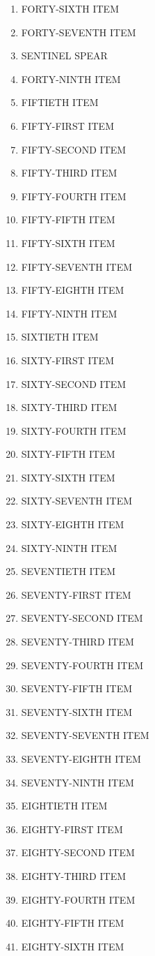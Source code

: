 \documentclass[11pt,letterpaper,oldstylefigures]{memoir}
\begin{document}
\begin{enumerate}
\item FORTY-SIXTH ITEM
\item FORTY-SEVENTH ITEM
\item SENTINEL SPEAR
\item FORTY-NINTH ITEM
\item FIFTIETH ITEM
\item FIFTY-FIRST ITEM
\item FIFTY-SECOND ITEM
\item FIFTY-THIRD ITEM
\item FIFTY-FOURTH ITEM
\item FIFTY-FIFTH ITEM
\item FIFTY-SIXTH ITEM
\item FIFTY-SEVENTH ITEM
\item FIFTY-EIGHTH ITEM
\item FIFTY-NINTH ITEM
\item SIXTIETH ITEM
\item SIXTY-FIRST ITEM
\item SIXTY-SECOND ITEM
\item SIXTY-THIRD ITEM
\item SIXTY-FOURTH ITEM
\item SIXTY-FIFTH ITEM
\item SIXTY-SIXTH ITEM
\item SIXTY-SEVENTH ITEM
\item SIXTY-EIGHTH ITEM
\item SIXTY-NINTH ITEM
\item SEVENTIETH ITEM
\item SEVENTY-FIRST ITEM
\item SEVENTY-SECOND ITEM
\item SEVENTY-THIRD ITEM
\item SEVENTY-FOURTH ITEM
\item SEVENTY-FIFTH ITEM
\item SEVENTY-SIXTH ITEM
\item SEVENTY-SEVENTH ITEM
\item SEVENTY-EIGHTH ITEM
\item SEVENTY-NINTH ITEM
\item EIGHTIETH ITEM
\item EIGHTY-FIRST ITEM
\item EIGHTY-SECOND ITEM
\item EIGHTY-THIRD ITEM
\item EIGHTY-FOURTH ITEM
\item EIGHTY-FIFTH ITEM
\item EIGHTY-SIXTH ITEM

\end{enumerate}
\end{document}
